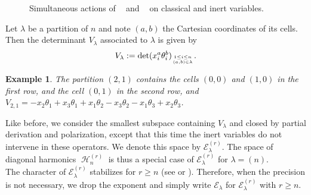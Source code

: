 \documentclass[letter,12pt]{article}
\newcommand{\Elambda}[1]{\mathcal{E}_{#1}}
\newcommand{\Elambdar}[2]{\mathcal{E}_{#1}^{(#2)}}
\DeclareMathOperator{\Sn}{\mathbb{S}_n}
\DeclareMathOperator{\GLr}{GL_r}
\DeclareMathOperator{\harmonics}{\mathcal{H}}
\newtheorem{example}{Example}
\begin{document}
	\begin{figure}[H]
		\centering
		\caption{Simultaneous actions of $\GLr$ and $\Sn$ on classical and inert variables.}
	\end{figure}
	
	Let $\lambda$ be a partition of $n$ and note $(a,b)$ the Cartesian coordinates of its cells. Then the determinant $V_{\lambda}$ associated to $\lambda$ is given by $$V_{\lambda} := \det (x_i^a \theta_i^b)_{1 \leq i \leq n \atop (a,b) \in \lambda} .$$
	
	\begin{example}
		The partition $(2,1)$ contains the cells $(0,0)$ and $(1,0)$ in the first row, and the cell $(0,1)$ in the second row, and $V_{2,1} = -x_2\theta_1 + x_3\theta_1 + x_1\theta_2 - x_3\theta_2 - x_1\theta_3 + x_2\theta_3$. 
	\end{example}
	
	
	Like before, we consider the smallest subspace containing $V_{\lambda}$ and closed by partial derivation and polarization, except that this time the inert variables do not intervene in these operators. We denote this space by $\Elambdar{\lambda}{r}$. The space of diagonal harmonics $\harmonics_n^{(r)}$ is thus a special case of $\Elambdar{\lambda}{r}$ for $\lambda = (n)$. \\
	
	The character of $\Elambdar{\lambda}{r}$ stabilizes for $r \geq n$ (see \cite{Bergeron2013} or \cite{Bergeron2009}). Therefore, when the precision is not necessary, we drop the exponent and simply write $\Elambda{\lambda}$ for $\Elambdar{\lambda}{r}$ with $r \geq n$. 
	
\end{document}
